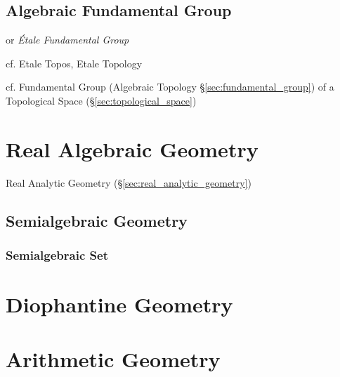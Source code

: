 \subsection{Algebraic Fundamental Group}
\label{sec:algebraic_fundamental_group}

or \emph{\'Etale Fundamental Group}

cf. Etale Topos, Etale Topology

cf. Fundamental Group (Algebraic Topology \S\ref{sec:fundamental_group}) of a
Topological Space (\S\ref{sec:topological_space})



\section{Real Algebraic Geometry}\label{sec:real_algebraic_geometry}

Real Analytic Geometry (\S\ref{sec:real_analytic_geometry})



\subsection{Semialgebraic Geometry}\label{sec:semialgebraic_geometry}

\subsubsection{Semialgebraic Set}\label{sec:semialgebraic_set}



\section{Diophantine Geometry}\label{sec:diophantine_geometry}

\section{Arithmetic Geometry}\label{sec:arithmetic_geometry}

